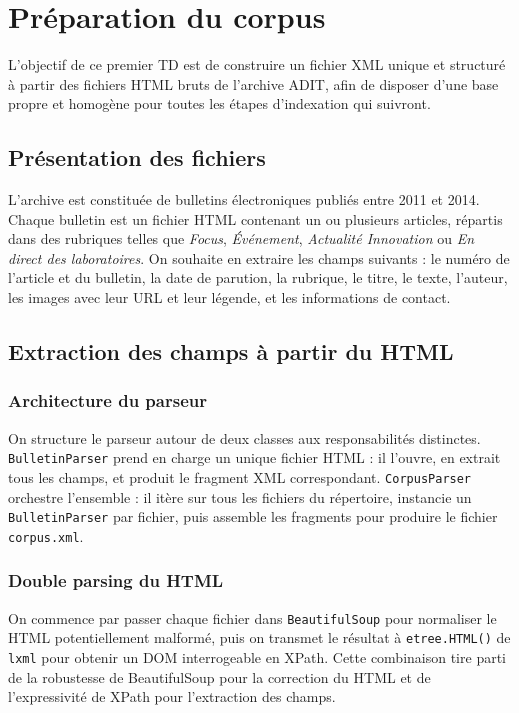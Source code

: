 \chapter{Préparation du corpus}

L'objectif de ce premier TD est de construire un fichier XML unique et structuré à partir des fichiers HTML bruts de l'archive ADIT, afin de disposer d'une base propre et homogène pour toutes les étapes d'indexation qui suivront.

\section{Présentation des fichiers}

L'archive est constituée de bulletins électroniques publiés entre 2011 et 2014. Chaque bulletin est un fichier HTML contenant un ou plusieurs articles, répartis dans des rubriques telles que \textit{Focus}, \textit{Événement}, \textit{Actualité Innovation} ou \textit{En direct des laboratoires}. On souhaite en extraire les champs suivants : le numéro de l'article et du bulletin, la date de parution, la rubrique, le titre, le texte, l'auteur, les images avec leur URL et leur légende, et les informations de contact.

\section{Extraction des champs à partir du HTML}

\subsection{Architecture du parseur}

On structure le parseur autour de deux classes aux responsabilités distinctes. \texttt{BulletinParser} prend en charge un unique fichier HTML : il l'ouvre, en extrait tous les champs, et produit le fragment XML correspondant. \texttt{CorpusParser} orchestre l'ensemble : il itère sur tous les fichiers du répertoire, instancie un \texttt{BulletinParser} par fichier, puis assemble les fragments pour produire le fichier \texttt{corpus.xml}.

\subsection{Double parsing du HTML}

On commence par passer chaque fichier dans \texttt{BeautifulSoup} pour normaliser le HTML potentiellement malformé, puis on transmet le résultat à \texttt{etree.HTML()} de \texttt{lxml} pour obtenir un DOM interrogeable en XPath. Cette combinaison tire parti de la robustesse de BeautifulSoup pour la correction du HTML et de l'expressivité de XPath pour l'extraction des champs.

